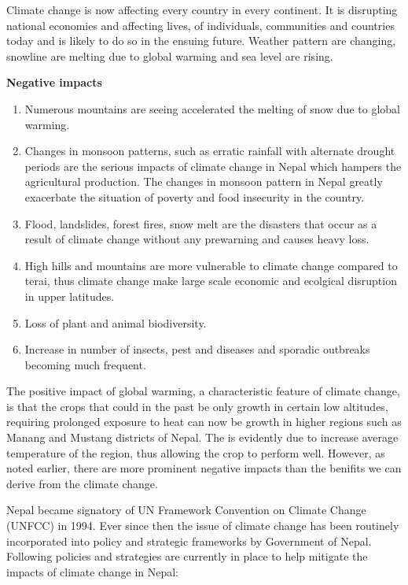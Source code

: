 \documentclass[
  openany]{book}
\providecommand{\tightlist}{%
  \setlength{\itemsep}{0pt}\setlength{\parskip}{0pt}}
\begin{document}
Climate change is now affecting every country in every continent. It is disrupting national economies and affecting lives, of individuals, communities and countries today and is likely to do so in the ensuing future. Weather pattern are changing, snowline are melting due to global warming and sea level are rising.

\textbf{Negative impacts}

\begin{enumerate}
\def\labelenumi{\arabic{enumi}.}
\tightlist
\item
  Numerous mountains are seeing accelerated the melting of snow due to global warming.
\item
  Changes in monsoon patterns, such as erratic rainfall with alternate drought periods are the serious impacts of climate change in Nepal which hampers the agricultural production. The changes in monsoon pattern in Nepal greatly exacerbate the situation of poverty and food insecurity in the country.
\item
  Flood, landslides, forest fires, snow melt are the disasters that occur as a result of climate change without any prewarning and causes heavy loss.
\item
  High hills and mountains are more vulnerable to climate change compared to terai, thus climate change make large scale economic and ecolgical disruption in upper latitudes.
\item
  Loss of plant and animal biodiversity.
\item
  Increase in number of insects, pest and diseases and sporadic outbreaks becoming much frequent.
\end{enumerate}

The positive impact of global warming, a characteristic feature of climate change, is that the crops that could in the past be only growth in certain low altitudes, requiring prolonged exposure to heat can now be growth in higher regions such as Manang and Mustang districts of Nepal. The is evidently due to increase average temperature of the region, thus allowing the crop to perform well. However, as noted earlier, there are more prominent negative impacts than the benifits we can derive from the climate change.

Nepal became signatory of UN Framework Convention on Climate Change (UNFCC) in 1994. Ever since then the issue of climate change has been routinely incorporated into policy and strategic frameworks by Government of Nepal. Following policies and strategies are currently in place to help mitigate the impacts of climate change in Nepal:
\end{document}
